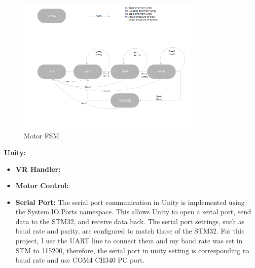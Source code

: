 \begin{figure}[h]
    \centering
    \includegraphics[width=0.8\textwidth]{Figures/SVM.png}
    \caption{Motor FSM}
    \label{fig:motor_fsm}
\end{figure}
\textbf{Unity:} 
\begin{itemize}
    \item \textbf{VR Handler:} 
    
    \item \textbf{Motor Control:} 
    
    \item \textbf{Serial Port:}
    The serial port communication in Unity is implemented using the System.IO.Ports namespace. This allows Unity to open a serial port, send data to the STM32, and receive data back. The serial port settings, such as baud rate and parity, are configured to match those of the STM32. For this project, I use the UART line to connect them and my baud rate was set in STM to 115200, therefore, the serial port in unity setting is corresponding to baud rate and use COM4 CH340 PC port.
\end{itemize}
